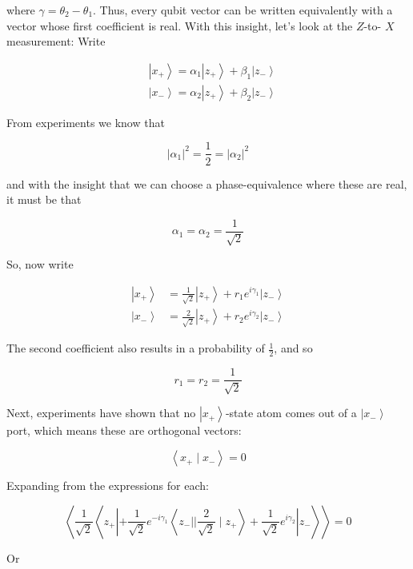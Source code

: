 \documentclass[main.tex]{subfiles}
\begin{document}
    where $\gamma=\theta_{2}-\theta_{1}$. Thus, every qubit vector can be written equivalently with a vector whose first coefficient is real. With this insight, let's look at the $Z$-to- $X$ measurement: Write
    
    $$
    \begin{aligned}
    &\left|x_{+}\right\rangle=\alpha_{1}\left|z_{+}\right\rangle+\beta_{1}\left|z_{-}\right\rangle \\
    &\left|x_{-}\right\rangle=\alpha_{2}\left|z_{+}\right\rangle+\beta_{2}\left|z_{-}\right\rangle
    \end{aligned}
    $$
    
    From experiments we know that
    
    $$
    \left|\alpha_{1}\right|^{2}=\frac{1}{2}=\left|\alpha_{2}\right|^{2}
    $$
    
    and with the insight that we can choose a phase-equivalence where these are real, it must be that
    
    $$
    \alpha_{1}=\alpha_{2}=\frac{1}{\sqrt{2}}
    $$
    
    So, now write
    
    $$
    \begin{aligned}
    \left|x_{+}\right\rangle &=\frac{1}{\sqrt{2}}\left|z_{+}\right\rangle+r_{1} e^{i \gamma_{1}}\left|z_{-}\right\rangle \\
    \left|x_{-}\right\rangle &=\frac{2}{\sqrt{2}}\left|z_{+}\right\rangle+r_{2} e^{i \gamma_{2}}\left|z_{-}\right\rangle
    \end{aligned}
    $$
    
    The second coefficient also results in a probability of $\frac{1}{2}$, and so
    
    $$
    r_{1}=r_{2}=\frac{1}{\sqrt{2}}
    $$
    
    Next, experiments have shown that no $\left|x_{+}\right\rangle$-state atom comes out of a $\left|x_{-}\right\rangle$port, which means these are orthogonal vectors:
    
    $$
    \left\langle x_{+} \mid x_{-}\right\rangle=0
    $$
    
    Expanding from the expressions for each:
    
    $$
    \left\langle\frac{1}{\sqrt{2}}\left\langle z_{+}\left|+\frac{1}{\sqrt{2}} e^{-i \gamma_{1}}\left\langle z_{-}|| \frac{2}{\sqrt{2}} \mid z_{+}\right\rangle+\frac{1}{\sqrt{2}} e^{i \gamma_{2}}\right| z_{-}\right\rangle\right\rangle=0
    $$
    
    Or
    
\end{document}
